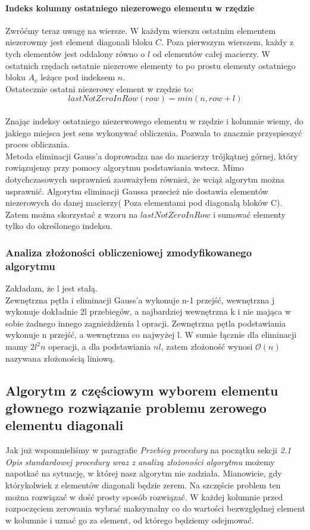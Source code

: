 \documentclass[11pt]{article}
\begin{document}
\begin{flushleft}
\paragraph{Indeks kolumny ostatniego niezerowego elementu w rzędzie} 
Zwróćmy teraz uwagę na wiersze. W każdym wierszu ostatnim elementem niezerowmy jest element diagonali bloku $C$. Poza pierwszym wierszem, każdy z tych elementów jest oddalony równo o $l$ od elementów całej macierzy. W ostatnich rzędach ostatnie niezerowe elementy to po prostu elementy ostatniego bloku $A_v$ leżące pod indeksem $n$. \\Ostatecznie ostatni niezerowy element w rzędzie to:
$$lastNotZeroInRow(row) = min(n, row+l)$$ \\
Znając indeksy ostatniego niezerwowego elementu w rzędzie i kolumnie wiemy, do jakiego miejsca jest sens wykonywać obliczenia. Pozwala to znacznie przyspieszyć proces obliczania.\\
Metoda eliminacji Gauss'a doprowadza nas do macierzy trójkątnej górnej, który rowiązujemy przy pomocy algorytmu podstawiania wstecz. Mimo dotychczasowych usprawnień zauważyłem również, że wciąż algorytm można usprawnić. Algorytm eliminacji Gaussa przecież nie dostawia elementów niezerowych do danej macierzy( Poza elementami pod diagonalą bloków C). Zatem można skorzystać z wzoru na  $lastNotZeroInRow$ i sumować elementy tylko do określonego indeksu.
\subsubsection{Analiza złożoności obliczeniowej zmodyfikowanego algorytmu}
Zakładam, że l jest stałą. \\
Zewnętrzna pętla i eliminacji Gauss'a  wykonuje n-1 przejść, wewnętrzna j wykonuje dokładnie 2l przebiegów, a najbardziej wewnętrzna k i nie mająca w sobie żadnego innego zagnieżdżenia l opracji. Zewnętrzna pętla podstawiania wykonuje n przejść, a wewnętrzna co najwyżej l. W sumie łącznie dla eliminacji mamy $2l^2n$ operacji, a dla podstawiania $nl$, zatem złożoność wynosi $\mathcal{O}(n)$ nazywana złożonością liniową.
\subsection{Algorytm z częściowym wyborem elementu głownego rozwiązanie problemu zerowego elementu diagonali}
Jak już wspomnieliśmy w paragrafie \textsl{Przebieg procedury} na początku sekcji \textsl{2.1 Opis standardowej procedury wraz z analizą złożoności algorytmu} możemy napotkać na sytuację, w której nasz algorytm nie zadziała. Mianowicie, gdy którykolwiek z elementów diagonali będzie zerem. Na szczęście problem ten można rozwiązać w dość prosty sposób rozwiązać. W każdej kolumnie przed rozpoczęciem zerowania wybrać maksymalny co do wartości bezwzględnej element w kolumnie i uznać go za element, od którego będziemy odejmować.

\end{flushleft}
\end{document}
